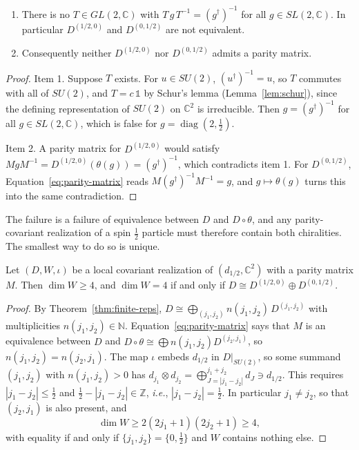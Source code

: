 	\begin{proposition}\label{prop:parity-problem}
		\begin{enumerate}
			\item There is no $T\in GL(2,\mathbb{C})$ with $T\,g\,T^{-1}=(g^\dagger)^{-1}$ for all $g\in SL(2,\mathbb{C})$. In particular $D^{(1/2,0)}$ and $D^{(0,1/2)}$ are not equivalent.
			\item Consequently neither $D^{(1/2,0)}$ nor $D^{(0,1/2)}$ admits a parity matrix.
		\end{enumerate}
	\end{proposition}
	
	\begin{proof}
		Item 1. Suppose $T$ exists. For $u\in SU(2)$, $(u^\dagger)^{-1}=u$, so $T$ commutes with all of $SU(2)$, and $T=c\,\mathbb{1}$ by Schur's lemma (Lemma~\ref{lem:schur}), since the defining representation of $SU(2)$ on $\mathbb{C}^2$ is irreducible. Then $g=(g^\dagger)^{-1}$ for all $g\in SL(2,\mathbb{C})$, which is false for $g=\operatorname{diag}(2,\tfrac12)$.
		
		Item 2. A parity matrix for $D^{(1/2,0)}$ would satisfy $MgM^{-1}=D^{(1/2,0)}(\theta(g))=(g^\dagger)^{-1}$, which contradicts item 1. For $D^{(0,1/2)}$, Equation~\eqref{eq:parity-matrix} reads $M(g^\dagger)^{-1}M^{-1}=g$, and $g\mapsto\theta(g)$ turns this into the same contradiction.
	\end{proof}
	
	The failure is a failure of equivalence between $D$ and $D\circ\theta$, and any parity-covariant realization of a spin $\frac12$ particle must therefore contain both chiralities. The smallest way to do so is unique.
	
	\begin{proposition}\label{prop:minimal-extension}
		Let $(D,W,\iota)$ be a local covariant realization of $(d_{1/2},\mathbb{C}^2)$ with a parity matrix $M$. Then $\dim W\geq4$, and $\dim W=4$ if and only if $D\cong D^{(1/2,0)}\oplus D^{(0,1/2)}$.
	\end{proposition}
	
	\begin{proof}
		By Theorem~\ref{thm:finite-reps}, $D\cong\bigoplus_{(j_1,j_2)}n(j_1,j_2)\,D^{(j_1,j_2)}$ with multiplicities $n(j_1,j_2)\in\mathbb{N}$. Equation~\eqref{eq:parity-matrix} says that $M$ is an equivalence between $D$ and $D\circ\theta\cong\bigoplus n(j_1,j_2)D^{(j_2,j_1)}$, so $n(j_1,j_2)=n(j_2,j_1)$. The map $\iota$ embeds $d_{1/2}$ in $D|_{SU(2)}$, so some summand $(j_1,j_2)$ with $n(j_1,j_2)>0$ has $d_{j_1}\otimes d_{j_2}=\bigoplus_{J=|j_1-j_2|}^{j_1+j_2}d_J\ni d_{1/2}$. This requires $|j_1-j_2|\leq\frac12$ and $\frac12-|j_1-j_2|\in\mathbb{Z}$, \textit{i.e.}, $|j_1-j_2|=\frac12$. In particular $j_1\neq j_2$, so that $(j_2,j_1)$ is also present, and
		\begin{equation*}
			\dim W\geq2(2j_1+1)(2j_2+1)\geq4,
		\end{equation*}
		with equality if and only if $\{j_1,j_2\}=\{0,\tfrac12\}$ and $W$ contains nothing else.
	\end{proof}
	

